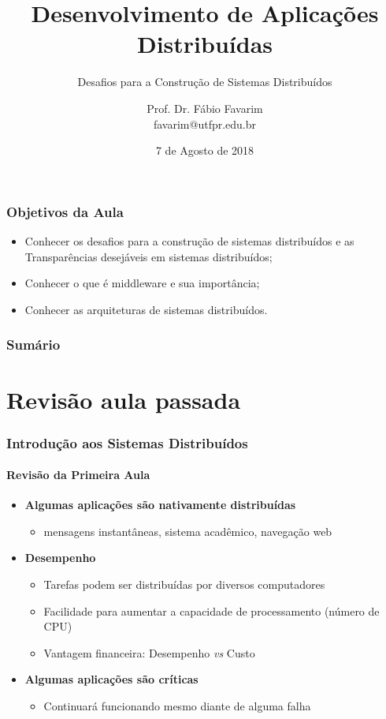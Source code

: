 \documentclass[hyperref={pdfpagelabels=false},table]{beamer}
\title[Desenv. Apl. Distribu\'{i}das - AD23S - 2018/2]{Desenvolvimento de Aplicaç\~{o}es Distribu\'{i}das}
\subtitle{Desafios para a Construç\~{a}o de Sistemas Distribu\'{i}dos}
\author[Prof. Dr. F\'{a}bio Favarim]{Prof. Dr. F\'{a}bio Favarim \texorpdfstring{\\ \footnotesize{favarim@utfpr.edu.br}}{}}
\institute[UTFPR]{ 
\small{\textbf{Universidade Tecnológica Federal do Paraná}}\\
Câmpus Pato Branco
}
\date{7 de Agosto de 2018}
\begin{document}
\begin{frame}
	\titlepage
\end{frame}

\begin{frame}[wide]
	\frametitle{Objetivos da Aula}
   \begin{block}{}
		\begin{itemize}
		  \item Conhecer os desafios para a construção de sistemas distribuídos e as Transparências desejáveis em sistemas distribuídos;
		  \item Conhecer o que é middleware e sua importância;
		  \item Conhecer as arquiteturas de sistemas distribuídos.
		\end{itemize}
   \end{block}
\end{frame}


\begin{frame}
	\frametitle{Sumário}
	\small
	\tableofcontents
	\normalsize
\end{frame}


\section*{Revisão aula passada}

\begin{frame}[wide]
	\frametitle{Introdução aos Sistemas Distribuídos}
	\framesubtitle{Revisão da Primeira Aula}
	\begin{itemize}
		\item \textbf{Algumas aplicações são nativamente distribuídas}
		\begin{itemize}
			\item mensagens instantâneas, sistema acadêmico, navegação web
		\end{itemize}
		\item \textbf{Desempenho}
		\begin{itemize}
			\item Tarefas podem ser distribuídas por diversos computadores
			\item Facilidade para aumentar a capacidade de processamento (número de CPU)
			\item Vantagem financeira: Desempenho \textit{vs} Custo
		\end{itemize}
		\item \textbf{Algumas aplicações são críticas}
		\begin{itemize}
			\item Continuará funcionando mesmo diante de alguma falha
		\end{itemize}
	\end{itemize}
\end{frame}
\end{document}
